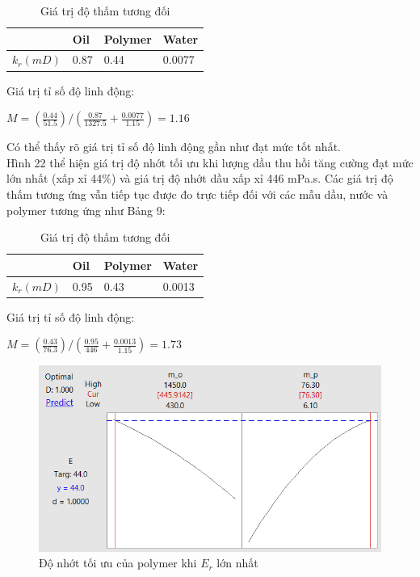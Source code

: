 \documentclass[12pt,a4paper]{article}
\begin{document}
\begin{table}[h]
\centering
\caption{Giá trị độ thấm tương đối}
\label{my-label}
\begin{tabularx}{\textwidth}{@{}XXXX@{}}
\toprule
      & Oil  & Polymer & Water  \\ \midrule
$k_r (mD)$ & 0.87 & 0.44    & 0.0077 \\ \bottomrule
\end{tabularx}
\end{table}
\newline
	Giá trị tỉ số độ linh động:
	\begin{center}
	\centering
		$M=\left(\frac{0.44}{51.5}\right)/\left(\frac{0.87}{1327.5}+\frac{0.0077}{1.15}\right)=1.16$
	\end{center}
	Có thể thấy rõ giá trị tỉ số độ linh động gần như đạt mức tốt nhất.\\
	Hình 22 thể hiện giá trị độ nhớt tối ưu khi lượng dầu thu hồi tăng cường đạt mức lớn nhất (xấp xỉ 44\%) và giá trị độ nhớt dầu xấp xỉ 446 mPa.s.
	Các giá trị độ thấm tương ứng vẫn tiếp tục được đo trực tiếp đối với các mẫu dầu, nước và polymer tương ứng như Bảng 9:
\begin{table}[h]
\centering
\caption{Giá trị độ thấm tương đối}
\label{my-label}
\begin{tabularx}{\textwidth}{@{}XXXX@{}}
\toprule
      & Oil  & Polymer & Water  \\ \midrule
$k_r (mD)$ & 0.95 & 0.43    & 0.0013 \\ \bottomrule
\end{tabularx}
\end{table}	
\newline
	Giá trị tỉ số độ linh động:
	\begin{center}
	\centering
		$M=\left(\frac{0.43}{76.3}\right)/\left(\frac{0.95}{446}+\frac{0.0013}{1.15}\right)=1.73$
	\end{center}
	\begin{figure}[h]
		\centering
		\includegraphics[scale=.9]{Fig/MaximumEr.PNG}
		\caption{Độ nhớt tối ưu của polymer khi $E_r$ lớn nhất}
	\end{figure}
\end{document}
